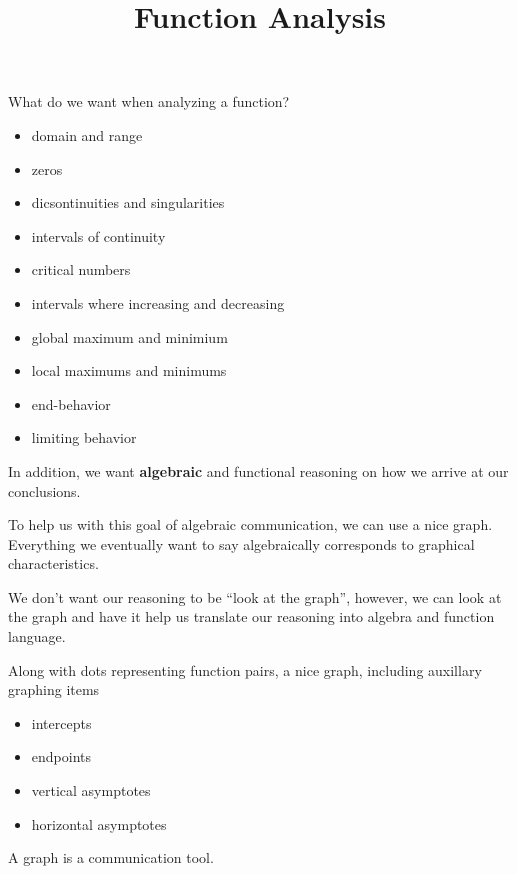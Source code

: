 \documentclass{ximera}
\title{Function Analysis}
\begin{document}
\begin{abstract}
%
\end{abstract}
\maketitle






What do we want when analyzing a function?


\begin{itemize}
\item domain and range
\item zeros 
\item dicsontinuities and singularities
\item intervals of continuity
\item critical numbers
\item intervals where increasing and decreasing
\item global maximum and minimium
\item local maximums and minimums
\item end-behavior
\item limiting behavior
\end{itemize}

In addition, we want \textbf{\textcolor{red!80!black}{algebraic}} and functional reasoning on how we arrive at our conclusions.


To help us with this goal of algebraic communication, we can use a nice graph.  Everything we eventually want to say algebraically corresponds to graphical characteristics.

We don't want our reasoning to be ``look at the graph'', however, we can look at the graph and have it help us translate our reasoning into algebra and function language.





Along with dots representing function pairs, a nice graph, including auxillary graphing items
\begin{itemize}
	\item intercepts
	\item endpoints
	\item vertical asymptotes
	\item horizontal asymptotes
\end{itemize}





A graph is a communication tool.
\end{document}
